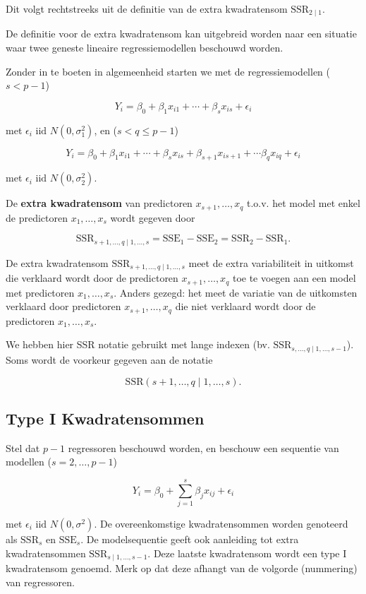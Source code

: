 \documentclass[
  12pt,dutch,coursenotes]{book}
\begin{document}
Dit volgt rechtstreeks uit de definitie van de extra kwadratensom \(\text{SSR}_{2\mid 1}\).

De definitie voor de extra kwadratensom kan uitgebreid worden naar een situatie waar twee geneste lineaire regressiemodellen beschouwd worden.

Zonder in te boeten in algemeenheid starten we met de regressiemodellen (\(s<p-1\))

\[
Y_i = \beta_0 + \beta_1 x_{i1} + \cdots + \beta_{s} x_{is} + \epsilon_i
\]

met \(\epsilon_i\text{ iid }N(0,\sigma_1^{2})\), en (\(s< q\leq p-1\))

\[
Y_i = \beta_0 + \beta_1 x_{i1} + \cdots + \beta_{s} x_{is} + \beta_{s+1} x_{is+1} + \cdots \beta_{q}x_{iq}+ \epsilon_i
\]

met \(\epsilon_i\text{ iid } N(0,\sigma_2^{2})\).

De \textbf{extra kwadratensom} van predictoren \(x_{s+1}, \ldots, x_q\) t.o.v. het model met enkel de predictoren \(x_1,\ldots, x_{s}\) wordt gegeven door

\[
  \text{SSR}_{s+1, \ldots, q\mid 1,\ldots, s} = \text{SSE}_1-\text{SSE}_2=\text{SSR}_2-\text{SSR}_1.
\]

De extra kwadratensom \(\text{SSR}_{s+1, \ldots, q\mid 1,\ldots, s}\) meet de extra variabiliteit in uitkomst die verklaard wordt door de predictoren \(x_{s+1}, \ldots, x_q\) toe te voegen aan een model met predictoren \(x_1,\ldots, x_{s}\).
Anders gezegd: het meet de variatie van de uitkomsten verklaard door predictoren \(x_{s+1}, \ldots, x_q\) die niet verklaard wordt door de predictoren \(x_1,\ldots, x_{s}\).

We hebben hier SSR notatie gebruikt met lange indexen (bv. \(\text{SSR}_{s, \ldots, q\mid 1,\ldots, s-1}\)). Soms wordt de voorkeur gegeven aan de notatie

\[
  \text{SSR}(s+1, \ldots, q\mid 1,\ldots, s).
\]

\hypertarget{type-i-kwadratensommen}{%
\subsection{Type I Kwadratensommen}\label{type-i-kwadratensommen}}

Stel dat \(p-1\) regressoren beschouwd worden, en beschouw een sequentie van modellen (\(s=2,\ldots, p-1\))

\[
Y_i = \beta_0 + \sum_{j=1}^{s} \beta_j x_{ij} + \epsilon_i
\]

met \(\epsilon_i\text{ iid } N(0,\sigma^{2})\).
De overeenkomstige kwadratensommen worden genoteerd als \(\text{SSR}_{s}\) en \(\text{SSE}_{s}\). De modelsequentie geeft ook aanleiding tot extra kwadratensommen \(\text{SSR}_{s\mid 1,\ldots, s-1}\). Deze laatste kwadratensom wordt een type I kwadratensom genoemd. Merk op dat deze afhangt van de volgorde (nummering) van regressoren.
\end{document}
